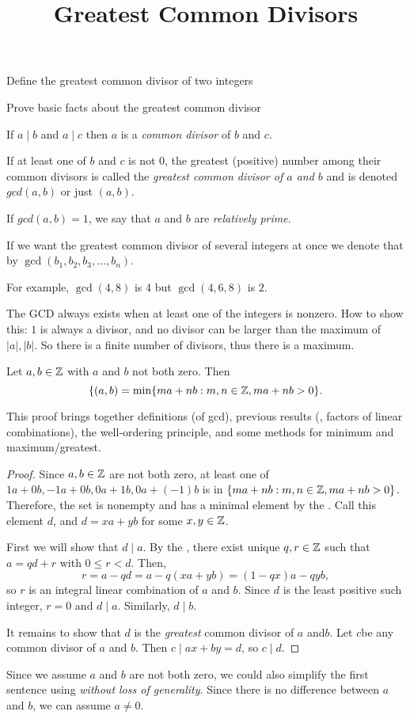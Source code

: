 \documentclass{ximera}
\title{Greatest Common Divisors}
\begin{document}
\begin{abstract}
\end{abstract}
\maketitle


\begin{obj}
\item Define the greatest common divisor of two integers
\item Prove basic facts about the greatest common divisor
\end{obj}


\begin{defn}\label{defn:gcd} 
  If $a\mid b$ and $a\mid c$ then $a$ is a \emph{common divisor} of $b$ and $c$.

  If at least one of $b$ and $c$ is not $0$, the greatest (positive) number among their common divisors  is called the \emph{greatest common divisor of $a$ and $b$} and is denoted $gcd(a,b)$ or just $(a,b)$. 
 
  If $gcd(a,b)=1$, we say that $a$ and $b$ are \emph{relatively prime}.

  If we want the greatest common divisor of several integers at once we denote that by $\gcd(b_1,b_2,b_3,\dots,b_n)$.
\end{defn}

For example, $\gcd(4,8)$ is $4$ but $\gcd(4,6,8)$ is $2$.

The GCD always exists when at least one of the integers is nonzero. How to show this: $1$ is always a divisor, and no divisor can be larger than the maximum of $|a|,|b|$. So there is a finite number of divisors, thus there is a maximum.


\begin{prop*}\label{Bezout}
  Let $a, b\in \mathbb Z$ with $a$ and $b$ not both zero. Then 
    \[\{(a,b)=\min\{ma+nb:m,n\in\mathbb Z, ma+nb>0\}.\]
\end{prop*}
This proof brings together definitions (of gcd), previous results (, factors of linear combinations), the well-ordering principle, and some methods for minimum and maximum/greatest.

\begin{proof}
  Since $a,b\in\mathbb Z$ are not both zero, at least one of $1a+0b, -1a+0b, 0a+1b, 0a+(-1)b$ is in $\{ma+nb:m,n\in\mathbb Z, ma+nb>0\}$. Therefore, the set is nonempty and has a minimal element by the . Call this element $d$, and $d=xa+yb$ for some $x,y\in \mathbb Z$.
 
  First we will show that $d\mid a$. By the , there exist unique $q,r\in\mathbb Z$ such that $a=qd+r$ with $0\leq r<d$. Then, \[r=a-qd=a-q(xa+yb)=(1-qx)a-qyb,\] so $r$ is an integral linear combination of $a$ and $b$.  Since $d$ is the least positive such integer, $r=0$ and $d\mid a$. Similarly, $d\mid b$. 

  It remains to show that $d$ is the \emph{greatest} common divisor of $a$ and$b$. Let $c$be any common divisor of $a$  and $b$. Then $c\mid ax+by=d$, so $c\mid d$.
\end{proof}

Since we assume $a$ and $b$ are not both zero, we could also simplify the first sentence using \emph{without loss of generality}. Since there is no difference between $a$ and $b$, we can assume $a\neq0$.

\end{document}
